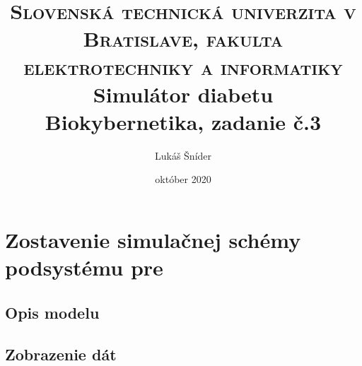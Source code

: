 \documentclass[11pt]{article} %
\title{	
	\normalfont\normalsize
	\textsc{Slovenská technická univerzita v Bratislave, fakulta elektrotechniky a informatiky}\\ %
	\vspace{25pt} %
	\vspace{20pt} %
	\vspace{20pt} %
	\vspace{20pt} %
	\vspace{20pt} %
	\vspace{20pt} %
	\vspace{20pt} %
	\vspace{20pt} %
	\vspace{20pt} %
		\vspace{20pt} %
	\vspace{20pt} %
	\huge Simulátor diabetu\\ %
	\vspace{12pt} %
	\normalsize Biokybernetika, zadanie č.3
	\vspace{20pt} %
	\vspace{20pt} %
	\vspace{20pt} %
		\vspace{20pt} %
	\vspace{20pt} %
		\vspace{20pt} %
	\vspace{20pt} %
		\vspace{20pt} %
	\vspace{20pt} %
	\vspace{20pt} %
	\vspace{20pt} %
		\vspace{20pt} %
	\vspace{20pt} %
	\vspace{12pt} %
}
\author{\LARGE Lukáš Šníder} %
\date{október 2020}
\begin{document}
\maketitle %
\thispagestyle{empty}
\clearpage
\setcounter{page}{1}

\section{Zostavenie simulačnej schémy podsystému pre }

\subsection{Opis modelu}

%

\subsection{Zobrazenie dát}
\end{document}
